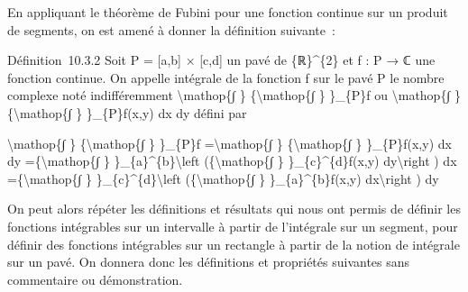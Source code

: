 \documentclass[]{article}
\begin{document}
En appliquant le théorème de Fubini pour une fonction continue sur un
produit de segments, on est amené à donner la définition suivante~:

Définition~10.3.2 Soit P = {[}a,b{]} × {[}c,d{]} un pavé de
\{ℝ\}\^{}\{2\} et f : P → ℂ une fonction continue. On appelle intégrale
de la fonction f sur le pavé P le nombre complexe noté indifféremment
\textbackslash{}mathop\{∫ \} \{\textbackslash{}mathop\{∫ \} \}\_\{P\}f
ou \textbackslash{}mathop\{∫ \} \{\textbackslash{}mathop\{∫ \}
\}\_\{P\}f(x,y) dx dy défini par

\textbackslash{}mathop\{∫ \} \{\textbackslash{}mathop\{∫ \} \}\_\{P\}f
=\textbackslash{}mathop\{∫ \} \{\textbackslash{}mathop\{∫ \}
\}\_\{P\}f(x,y) dx dy =\{\textbackslash{}mathop\{∫ \}
\}\_\{a\}\^{}\{b\}\textbackslash{}left (\{\textbackslash{}mathop\{∫ \}
\}\_\{c\}\^{}\{d\}f(x,y) dy\textbackslash{}right ) dx
=\{\textbackslash{}mathop\{∫ \} \}\_\{c\}\^{}\{d\}\textbackslash{}left
(\{\textbackslash{}mathop\{∫ \} \}\_\{a\}\^{}\{b\}f(x,y)
dx\textbackslash{}right ) dy

On peut alors répéter les définitions et résultats qui nous ont permis
de définir les fonctions intégrables sur un intervalle à partir de
l'intégrale sur un segment, pour définir des fonctions intégrables sur
un rectangle à partir de la notion de intégrale sur un pavé. On donnera
donc les définitions et propriétés suivantes sans commentaire ou
démonstration.
\end{document}
